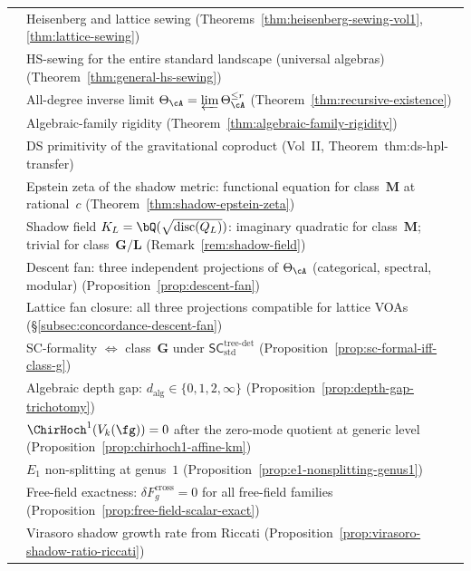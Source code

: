 \begin{center}
\begin{tabular}{cp{10.5cm}}
& Heisenberg and lattice sewing
 \textup{(}Theorems~\ref{thm:heisenberg-sewing-vol1},
 \ref{thm:lattice-sewing}\textup{)} \\
& HS-sewing for the entire standard landscape (universal algebras)
 \textup{(}Theorem~\ref{thm:general-hs-sewing}\textup{)} \\
& All-degree inverse limit
 $\Theta_\cA = \varprojlim \Theta_\cA^{\le r}$
 \textup{(}Theorem~\ref{thm:recursive-existence}\textup{)} \\
& Algebraic-family rigidity
 \textup{(}Theorem~\ref{thm:algebraic-family-rigidity}\textup{)} \\
& DS primitivity of the gravitational coproduct
 (Vol~II, Theorem~\textup{thm:ds-hpl-transfer}) \\
& Epstein zeta of the shadow metric: functional equation
 for class~$\mathbf{M}$ at rational~$c$
 \textup{(}Theorem~\ref{thm:shadow-epstein-zeta}\textup{)} \\
& Shadow field $K_L = \bQ(\sqrt{\operatorname{disc}(Q_L)})$:
 imaginary quadratic for class~$\mathbf{M}$;
 trivial for class~$\mathbf{G}/\mathbf{L}$
 \textup{(}Remark~\ref{rem:shadow-field}\textup{)} \\
& Descent fan: three independent projections of
 $\Theta_\cA$ (categorical, spectral, modular)
 \textup{(}Proposition~\ref{prop:descent-fan}\textup{)} \\
& Lattice fan closure: all three projections
 compatible for lattice VOAs
 \textup{(}\S\ref{subsec:concordance-descent-fan}\textup{)} \\
& SC-formality $\iff$ class~$\mathbf{G}$ under
 $\mathsf{SC}^{\mathrm{tree}\text{-}\mathrm{det}}_{\mathrm{std}}$
 \textup{(}Proposition~\ref{prop:sc-formal-iff-class-g}\textup{)} \\
& Algebraic depth gap:
 $d_{\mathrm{alg}} \in \{0,1,2,\infty\}$
 \textup{(}Proposition~\ref{prop:depth-gap-trichotomy}\textup{)} \\
& $\ChirHoch^1(V_k(\fg)) = 0$ after the zero-mode quotient at generic level
 \textup{(}Proposition~\ref{prop:chirhoch1-affine-km}\textup{)} \\
& $E_1$ non-splitting at genus~$1$
 \textup{(}Proposition~\ref{prop:e1-nonsplitting-genus1}\textup{)} \\
& Free-field exactness:
 $\delta F_g^{\mathrm{cross}} = 0$ for all free-field families
 \textup{(}Proposition~\ref{prop:free-field-scalar-exact}\textup{)} \\
& Virasoro shadow growth rate from Riccati
 \textup{(}Proposition~\ref{prop:virasoro-shadow-ratio-riccati}\textup{)} \\

\end{tabular}
\end{center}
